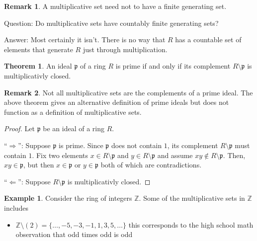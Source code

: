 \documentclass[a4paper]{book}
\theoremstyle{definition}
\newtheorem{example}{Example}[definition]
\newtheorem{theorem}[definition]{Theorem}
\newtheorem*{remark}{Remark}
\begin{document}
\begin{rembox}
    \begin{remark}
        A multiplicative set need not to have a finite generating set.
    \end{remark}
\end{rembox}

Question: Do multiplicative sets have countably finite generating sets?

Answer: Most certainly it isn't. There is no way that \(R\) has a countable set of elements that generate \(R\) just through multiplication.

\begin{thmbox}
    \begin{theorem}
        An ideal \(\mathfrak{p}\) of a ring \(R\) is prime if and only if its complement \(R \setminus \mathfrak{p}\) is multiplicativly closed.
    \end{theorem}
\end{thmbox}

\begin{rembox}
    \begin{remark}
        Not all multiplicative sets are the complements of a prime ideal. The above theorem gives an alternative definition of prime ideals but does not function as a definition of multiplicative sets.
    \end{remark}
\end{rembox}

\begin{proof}
    Let \(\mathfrak{p}\) be an ideal of a ring \(R\).

    \noindent``\(\Rightarrow\)'': Suppose \(\mathfrak{p}\) is prime. Since \(\mathfrak{p}\) does not contain \(1\), its complement \(R \setminus \mathfrak{p}\) must contain \(1\). Fix two elements \(x \in R \setminus \mathfrak{p}\) and \(y \in R \setminus \mathfrak{p}\) and assume \(xy \not\in R \setminus \mathfrak{p}\). Then, \(xy \in \mathfrak{p}\), but then \(x \in \mathfrak{p}\) or \(y \in \mathfrak{p}\) both of which are contradictions.

    \noindent ``\(\Leftarrow\)'': Suppose \(R \setminus \mathfrak{p}\) is multiplicativly closed. 
\end{proof}

\begin{example}
    Consider the ring of integers \(\mathbb{Z}\). Some of the multiplicative sets in \(\mathbb{Z}\) includes
    \begin{itemize}
        \item \(\mathbb{Z} \setminus (2) = \{\ldots, -5, -3, -1, 1, 3, 5, \ldots\}\) this corresponds to the high school math observation that odd times odd is odd
    \end{itemize}
\end{example}
\end{document}
